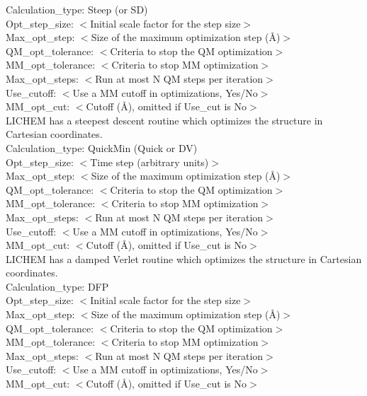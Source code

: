 \documentclass[12pt]{report}
\begin{document}
Calculation\_type: Steep (or SD) \\
Opt\_step\_size: $<$Initial scale factor for the step size$>$ \\
Max\_opt\_step: $<$Size of the maximum optimization step (\AA)$>$ \\
QM\_opt\_tolerance: $<$Criteria to stop the QM optimization$>$ \\
MM\_opt\_tolerance: $<$Criteria to stop MM optimization$>$ \\
Max\_opt\_steps: $<$Run at most N QM steps per iteration$>$ \\
Use\_cutoff: $<$Use a MM cutoff in optimizations, Yes/No$>$ \\
MM\_opt\_cut: $<$Cutoff (\AA), omitted if Use\_cut is No$>$ \\

LICHEM has a steepest descent routine which optimizes the structure in
Cartesian coordinates. \\

Calculation\_type: QuickMin (Quick or DV) \\
Opt\_step\_size: $<$Time step (arbitrary units)$>$ \\
Max\_opt\_step: $<$Size of the maximum optimization step (\AA)$>$ \\
QM\_opt\_tolerance: $<$Criteria to stop the QM optimization$>$ \\
MM\_opt\_tolerance: $<$Criteria to stop MM optimization$>$ \\
Max\_opt\_steps: $<$Run at most N QM steps per iteration$>$ \\
Use\_cutoff: $<$Use a MM cutoff in optimizations, Yes/No$>$ \\
MM\_opt\_cut: $<$Cutoff (\AA), omitted if Use\_cut is No$>$ \\

LICHEM has a damped Verlet routine which optimizes the structure in
Cartesian coordinates. \\

Calculation\_type: DFP \\
Opt\_step\_size: $<$Initial scale factor for the step size$>$ \\
Max\_opt\_step: $<$Size of the maximum optimization step (\AA)$>$ \\
QM\_opt\_tolerance: $<$Criteria to stop the QM optimization$>$ \\
MM\_opt\_tolerance: $<$Criteria to stop MM optimization$>$ \\
Max\_opt\_steps: $<$Run at most N QM steps per iteration$>$ \\
Use\_cutoff: $<$Use a MM cutoff in optimizations, Yes/No$>$ \\
MM\_opt\_cut: $<$Cutoff (\AA), omitted if Use\_cut is No$>$ \\
\end{document}
